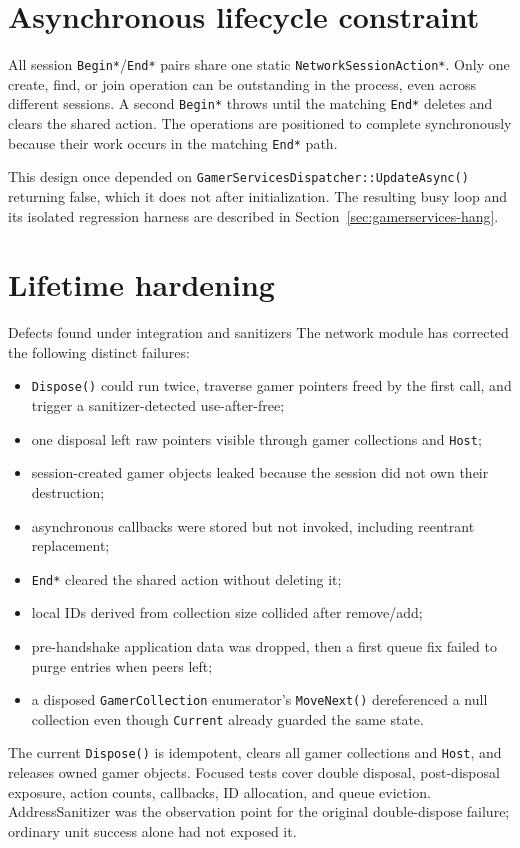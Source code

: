 \section{Asynchronous lifecycle constraint}

All session \texttt{Begin*}/\texttt{End*} pairs share one static
\texttt{NetworkSessionAction*}. Only one create, find, or join operation can be outstanding in
the process, even across different sessions. A second \texttt{Begin*} throws until the matching
\texttt{End*} deletes and clears the shared action. The operations are positioned to complete
synchronously because their work occurs in the matching \texttt{End*} path.

This design once depended on
\texttt{GamerServicesDispatcher::}\allowbreak\texttt{UpdateAsync()} returning false,
which it does not after initialization. The resulting busy loop and its isolated regression
harness are described in Section~\ref{sec:gamerservices-hang}.

\section{Lifetime hardening}

\begin{historynote}{Defects found under integration and sanitizers}
The network module has corrected the following distinct failures:

\begin{itemize}
  \item \texttt{Dispose()} could run twice, traverse gamer pointers freed by the first call,
        and trigger a sanitizer-detected use-after-free;
  \item one disposal left raw pointers visible through gamer collections and \texttt{Host};
  \item session-created gamer objects leaked because the session did not own their destruction;
  \item asynchronous callbacks were stored but not invoked, including reentrant replacement;
  \item \texttt{End*} cleared the shared action without deleting it;
  \item local IDs derived from collection size collided after remove/add;
  \item pre-handshake application data was dropped, then a first queue fix failed to purge
        entries when peers left;
  \item a disposed \texttt{GamerCollection} enumerator's \texttt{MoveNext()} dereferenced a null
        collection even though \texttt{Current} already guarded the same state.
\end{itemize}

The current \texttt{Dispose()} is idempotent, clears all gamer collections and \texttt{Host},
and releases owned gamer objects. Focused tests cover double disposal, post-disposal exposure,
action counts, callbacks, ID allocation, and queue eviction. AddressSanitizer was the observation
point for the original double-dispose failure; ordinary unit success alone had not exposed it.
\end{historynote}

